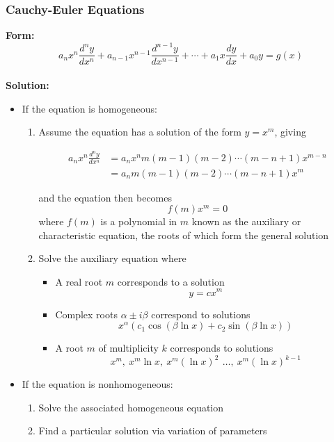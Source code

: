\documentclass{article}
\begin{document}
\subsubsection{Cauchy-Euler Equations}

\textbf{Form:} \[a_n x^n \frac{d^n y}{dx^n} + a_{n - 1} x^{n - 1} \frac{d^{n - 1} y}{dx^{n - 1}} + \cdots + a_1 x \frac{dy}{dx} + a_0 y = g(x)\] \\ \textbf{Solution:} \begin{itemize}
  \item If the equation is homogeneous:

        \begin{enumerate}
          \item Assume the equation has a solution of the form $y = x^m$, giving

                \begin{align*}
                  a_n x^n \frac{d^n y}{dx^n} & = a_n x^n m (m - 1) (m - 2) \cdots (m - n + 1) x^{m - n} \\
                                             & = a_n m (m - 1) (m - 2) \cdots (m - n + 1) x^m
                \end{align*}

                and the equation then becomes \[f(m) x^m = 0\] where $f(m)$ is a polynomial in $m$ known as the auxiliary or characteristic equation, the roots of which form the general solution

          \item Solve the auxiliary equation where

                \begin{itemize}
                  \item A real root $m$ corresponds to a solution \[y = c x^m\]

                  \item Complex roots $\alpha \pm i \beta$ correspond to solutions \[x^\alpha (c_1 \cos (\beta \ln x) + c_2 \sin (\beta \ln x))\]

                  \item A root $m$ of multiplicity $k$ corresponds to solutions \[x^m, \: x^m \ln x, \: x^m (\ln x)^2\, \:\ldots, \: x^m (\ln x)^{k - 1}\]
                \end{itemize}
        \end{enumerate}

  \item If the equation is nonhomogeneous:

        \begin{enumerate}
          \item Solve the associated homogeneous equation

          \item Find a particular solution via variation of parameters
        \end{enumerate}
\end{itemize}
\end{document}
